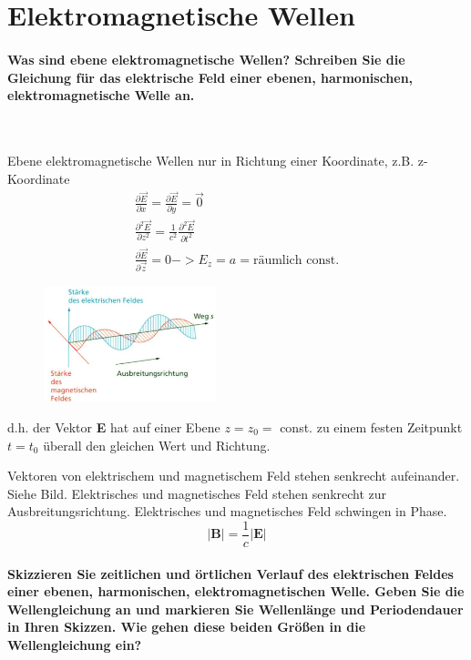 \documentclass[a4paper, 11pt, parskip=half]{scrartcl}
\begin{document}
\newpage

\section{Elektromagnetische Wellen}

\paragraph{Was sind ebene elektromagnetische Wellen? Schreiben Sie die Gleichung für das elektrische
Feld einer ebenen, harmonischen, elektromagnetische Welle an.} ~

Ebene elektromagnetische Wellen nur in Richtung einer Koordinate, z.B. z- Koordinate
\begin{equation}
\begin{split}
\frac{\partial \vec{E}}{\partial x} = \frac{\partial \vec{E}}{\partial y} = \vec{0} \\
\frac{\partial^2 \vec{E}}{\partial z^2} = \frac{1}{c^2} \frac{\partial^2 \vec{E}}{\partial t^2} \\
\frac{\partial \vec{E}}{\partial \vec{z}} = 0 -> E_z = a = \text{räumlich const.}
\end{split}
\end{equation}
\begin{figure}[H]
    \centering
    \includegraphics[width=5cm]{image/13/1.png}
\end{figure}
d.h. der Vektor \textbf{E} hat auf einer Ebene $z = z_0 =$ const. zu einem festen Zeitpunkt
$t = t_0$ überall den gleichen Wert und Richtung.

Vektoren von elektrischem und magnetischem Feld stehen senkrecht aufeinander. Siehe Bild.
Elektrisches und magnetisches Feld stehen senkrecht zur Ausbreitungsrichtung. Elektrisches und
magnetisches Feld schwingen in Phase.
\begin{equation}
|\textbf{B}| = \frac{1}{c} |\textbf{E}|
\end{equation}

\newpage

\paragraph{Skizzieren Sie zeitlichen und örtlichen Verlauf des elektrischen Feldes einer ebenen,
harmonischen, elektromagnetischen Welle. Geben Sie die Wellengleichung an und markieren Sie
Wellenlänge und Periodendauer in Ihren Skizzen. Wie gehen diese beiden Größen in die Wellengleichung
ein?} ~
\end{document}
